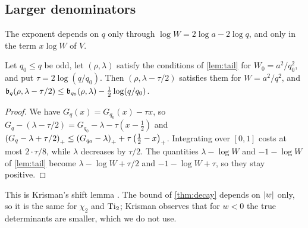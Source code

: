 \subsection{Larger denominators}\label{subsec:shift}

The exponent depends on $q$ only through $\log W=2\log a-2\log q$, and only in the term $x\log W$
of $V$.

\begin{proposition}[shift]\label{prop:shift}
Let $q_0\le q$ be odd, let $(\rho,\lambda)$ satisfy the conditions of \cref{lem:tail} for
$W_0=a^2/q_0^2$, and put $\tau=2\log(q/q_0)$. Then $(\rho,\lambda-\tau/2)$ satisfies them for
$W=a^2/q^2$, and $\mathfrak{b}_q(\rho,\lambda-\tau/2)\le\mathfrak{b}_{q_0}(\rho,\lambda)-\frac12\log(q/q_0)$.
\end{proposition}

\begin{proof}
We have $G_q(x)=G_{q_0}(x)-\tau x$, so $G_q-(\lambda-\tau/2)=G_{q_0}-\lambda-\tau(x-\frac12)$ and
$\left(G_q-\lambda+\tau/2\right)_{+}\le\left(G_{q_0}-\lambda\right)_{+}+\tau\left(\frac12-x\right)_{+}$. Integrating over $[0,1]$
costs at most $2\cdot\tau/8$, while $\lambda$ decreases by $\tau/2$. The quantities
$\lambda-\log W$ and $-1-\log W$ of \cref{lem:tail} become $\lambda-\log W+\tau/2$ and $-1-\log W+\tau$, so they stay positive.
\end{proof}

This is Krisman's shift lemma \cite[Lemma~7.1]{Krisman2026chi2}. The bound of
\cref{thm:decay} depends on $\left\lvert w\right\rvert$ only, so it is the same for $\chi_2$ and $\operatorname{Ti}_2$; Krisman
observes \cite[Remark~6.7]{Krisman2026chi2} that for $w<0$ the true determinants are smaller,
which we do not use.
